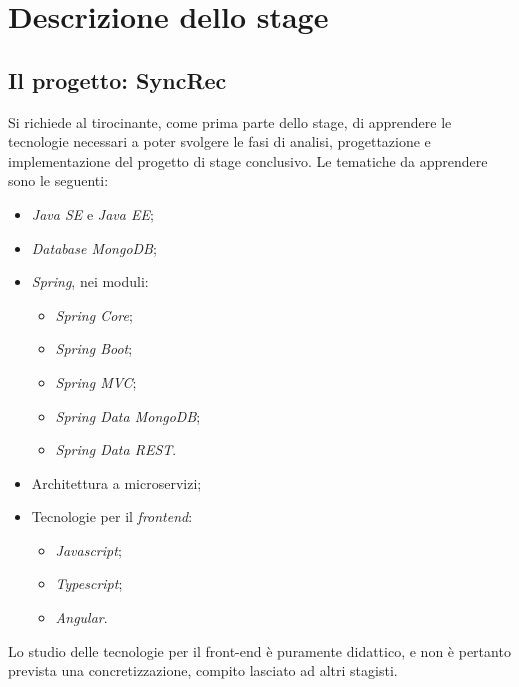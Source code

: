 
\chapter{Descrizione dello stage}\label{cap:descrizione-stage}



\section{Il progetto: SyncRec}

Si richiede al tirocinante, come prima parte dello stage, di apprendere le tecnologie necessari a poter svolgere le fasi di analisi, progettazione e implementazione del progetto di stage conclusivo.
Le tematiche da apprendere sono le seguenti:
\begin{itemize}
	\item \textit{Java SE} e \textit{Java EE};
	\item \textit{Database MongoDB};
	\item \textit{Spring}, nei moduli:
	\begin{itemize}[noitemsep]
		\item \textit{Spring Core};
		\item \textit{Spring Boot};
		\item \textit{Spring MVC};
		\item \textit{Spring Data MongoDB};
		\item \textit{Spring Data REST}.
	\end{itemize}
	\item Architettura a microservizi;
	\item Tecnologie per il \textit{frontend}:
	\begin{itemize}[noitemsep]
		\item \textit{Javascript};
		\item \textit{Typescript};
		\item \textit{Angular}.
	\end{itemize}
\end{itemize}

Lo studio delle tecnologie per il front-end è puramente didattico, e non è pertanto prevista una concretizzazione, compito lasciato ad altri stagisti.


